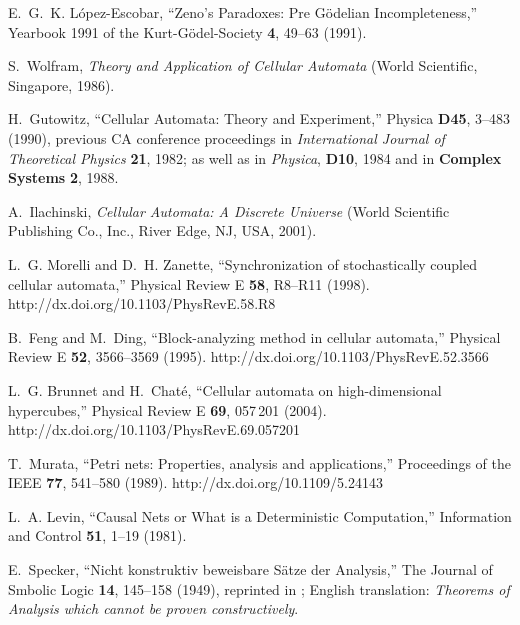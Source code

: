 \documentclass[pre,amssymb,showpacs,showkeys,preprint]{revtex4}
\begin{document}
\begin{thebibliography}{10}
E.~G.~K. L{\'{o}}pez-Escobar, \enquote{{Z}eno's Paradoxes: Pre {G}{\"{o}}delian
  Incompleteness,} Yearbook 1991 of the Kurt-G{\"{o}}del-Society {\bf 4},
  49--63 (1991).

S.~Wolfram, {\em Theory and Application of Cellular Automata\/} (World
  Scientific, Singapore, 1986).

H.~Gutowitz, \enquote{Cellular Automata: Theory and Experiment,} Physica {\bf
  D45}, 3--483 (1990), previous CA conference proceedings in {\em International
  Journal of Theoretical Physics} {\bf 21}, 1982; as well as in {\em Physica},
  {\bf D10}, 1984 and in {\bf Complex Systems} {\bf 2}, 1988.

A.~Ilachinski, {\em Cellular Automata: A Discrete Universe\/} (World Scientific
  Publishing Co., Inc., River Edge, NJ, USA, 2001).

L.~G. Morelli and D.~H. Zanette, \enquote{Synchronization of stochastically
  coupled cellular automata,} Physical Review E {\bf 58}, R8--R11 (1998).
\newline http://dx.doi.org/10.1103/PhysRevE.58.R8

B.~Feng and M.~Ding, \enquote{Block-analyzing method in cellular automata,}
  Physical Review E {\bf 52}, 3566--3569 (1995).
\newline http://dx.doi.org/10.1103/PhysRevE.52.3566

L.~G. Brunnet and H.~Chat{\'{e}}, \enquote{Cellular automata on
  high-dimensional hypercubes,} Physical Review E {\bf 69}, 057\,201 (2004).
\newline http://dx.doi.org/10.1103/PhysRevE.69.057201

T.~Murata, \enquote{Petri nets: Properties, analysis and applications,}
  Proceedings of the IEEE {\bf 77}, 541--580 (1989).
\newline http://dx.doi.org/10.1109/5.24143

L.~A. Levin, \enquote{Causal Nets or What is a Deterministic Computation,}
  Information and Control {\bf 51}, 1--19 (1981).

E.~Specker, \enquote{Nicht konstruktiv beweisbare {S}\"atze der {A}nalysis,}
  The Journal of Smbolic Logic {\bf 14}, 145--158 (1949), reprinted in
  \cite[pp. 35--48]{specker-ges}; {E}nglish translation: {\it Theorems of
  Analysis which cannot be proven constructively}.


\end{thebibliography}
\end{document}
